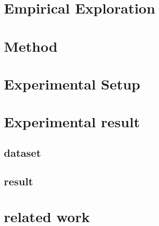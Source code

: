 \section{Empirical Exploration}





\section{Method}

\section{Experimental Setup}



\section{Experimental result}

\subsection{dataset}
\subsection{result}

\section{related work}


